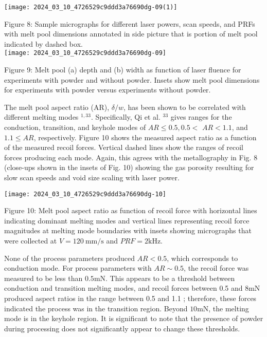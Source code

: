 \documentclass[10pt]{article}
\begin{document}
\begin{center}
\texttt{[image: 2024\_03\_10\_4726529c9ddd3a76690dg-09(1)]}
\end{center}

Figure 8: Sample micrographs for different laser powers, scan speeds, and PRFs with melt pool dimensions annotated in side picture that is portion of melt pool indicated by dashed box.\\
\texttt{[image: 2024\_03\_10\_4726529c9ddd3a76690dg-09]}

Figure 9: Melt pool (a) depth and (b) width as function of laser fluence for experiments with powder and without powder. Insets show melt pool dimensions for experiments with powder versus experiments without powder.

The melt pool aspect ratio (AR), $\delta / w$, has been shown to be correlated with different melting modes ${ }^{1,33}$. Specifically, Qi et al. ${ }^{33}$ gives ranges for the conduction, transition, and keyhole modes of $A R \leq 0.5,0.5<$ $A R<1.1$, and $1.1 \leq A R$, respectively. Figure 10 shows the measured aspect ratio as a function of the measured recoil forces. Vertical dashed lines show the ranges of recoil forces producing each mode. Again, this agrees with the metallography in Fig. 8 (close-ups shown in the insets of Fig. 10) showing the gas porosity resulting for slow scan speeds and void size scaling with laser power.

\begin{center}
\texttt{[image: 2024\_03\_10\_4726529c9ddd3a76690dg-10]}
\end{center}

Figure 10: Melt pool aspect ratio as function of recoil force with horizontal lines indicating dominant melting modes and vertical lines representing recoil force magnitudes at melting mode boundaries with insets showing micrographs that were collected at $V=120 \mathrm{~mm} / \mathrm{s}$ and $P R F=2 \mathrm{kHz}$.

None of the process parameters produced $A R<0.5$, which corresponds to conduction mode. For process parameters with $A R \sim 0.5$, the recoil force was measured to be less than $0.5 \mathrm{mN}$. This appears to be a threshold between conduction and transition melting modes, and recoil forces between 0.5 and $8 \mathrm{mN}$ produced aspect ratios in the range between 0.5 and 1.1 ; therefore, these forces indicated the process was in the transition region. Beyond $10 \mathrm{mN}$, the melting mode is in the keyhole region. It is significant to note that the presence of powder during processing does not significantly appear to change these thresholds.
\end{document}
